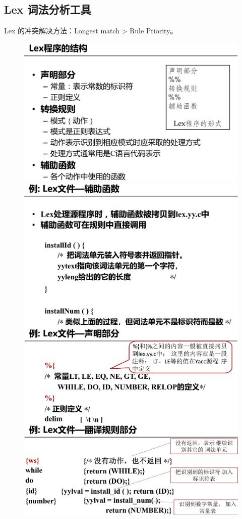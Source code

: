 \subsection*{Lex 词法分析工具}
\par Lex 的冲突解决方法：Longest match > Rule Priority。
\begin{figure}[H]
    \centering
    \includegraphics[width=0.4\linewidth]{figures/lex7.png}
    \includegraphics[width=0.4\linewidth]{figures/lex10.png}
    \includegraphics[width=0.4\linewidth]{figures/lex8.png}
    \includegraphics[width=0.4\linewidth]{figures/lex9.png}
\end{figure}
